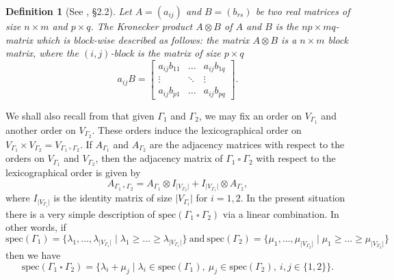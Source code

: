 \documentclass{amsart}
\newtheorem{defn}[theo]{Definition}
\theoremstyle{definition}
\numberwithin{equation}{section}
\begin{document}
\begin{defn}[See \cite{belardo1}, \S 2.2] Let $A= (a_{ij})$ and $B = (b_{rs})$ be two real matrices of size $n \times m$ and $p \times q$. The \textit{Kronecker product} $A \otimes B$ of $A$ and $B$ is the $np \times mq$-matrix which is block-wise described as follows: the matrix $A \otimes B$ is a $n \times m$ block matrix, where the $(i,j)$-block is the matrix of size $p \times q$
\begin{equation}
    a_{ij}B = \begin{bmatrix} a_{ij}b_{11} & \dots & a_{ij} b_{1q} \\ \vdots & \ddots &\vdots \\
    a_{ij}b_{p1} & \dots & a_{ij} b_{pq}\end{bmatrix}.
\end{equation}
\end{defn}
We shall also recall from \cite{spectrabook, crs} that given $\Gamma_1$ and $\Gamma_2$, we may fix an order on  $V_{\Gamma_1}$ and another order on $V_{\Gamma_2}$. These orders induce the lexicographical order on $V_{\Gamma_1} \times V_{\Gamma_2} = V_{\Gamma_1 \ \square  \ \Gamma_2}$. If $A_{\Gamma_1}$ and $A_{\Gamma_2}$ are the adjacency matrices with respect to the orders on $V_{\Gamma_1}$ and $V_{\Gamma_2}$, then the adjacency matrix of $\Gamma_1  \ \square  \ \Gamma_2$ with respect to the lexicographical order is given by
\begin{equation}\label{agammaproduct1}
    A_{\Gamma_1 \ \square  \ \Gamma_2} = A_{\Gamma_1} \otimes I_{\vert V_{\Gamma_2}\vert} + I_{\vert V_{\Gamma_1}\vert}\otimes A_{\Gamma_2},
\end{equation}
where $I_{\vert V_{\Gamma_i}\vert}$ is the identity matrix of size $\vert V_{\Gamma_i}\vert$ for $i=1,2$. In the present situation  there is a very simple description of $\mathrm{spec}(\Gamma_1 \ \square \ \Gamma_2)$ via a linear combination. In other words, if  
\begin{equation}
\label{agammafactors1}
\mathrm{spec}(\Gamma_1) =\{\lambda_1, \ldots, \lambda_{\vert V_{\Gamma_1}\vert} \mid  \lambda_1 \geq \dots \geq \lambda_{\vert V_{\Gamma_1}\vert}\} \ \mbox{and} \ \mathrm{spec}(\Gamma_2) =\{\mu_1, \ldots, \mu_{\vert V_{\Gamma_2}\vert} \mid  \mu_1 \geq \dots \geq \mu_{\vert V_{\Gamma_2}\vert}\}
\end{equation} 
then we have
\begin{equation}
\label{agammaspectrum1}\mathrm{spec}(\Gamma_1 \ \square \ \Gamma_2) = \{   \lambda_i + \mu_j \mid  \lambda_i \in \mathrm{spec}(\Gamma_1), \  \mu_j \in \mathrm{spec}(\Gamma_2), \ i,j \in \{1, 2\}\}.
\end{equation}
\end{document}
